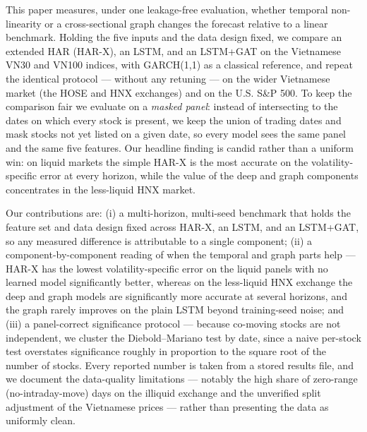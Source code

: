 \documentclass[runningheads]{llncs}
\begin{document}
This paper measures, under one leakage-free evaluation, whether temporal non-linearity or a cross-sectional
graph changes the forecast relative to a linear benchmark. Holding the five inputs and the data design fixed, we
compare an extended HAR (HAR-X), an LSTM, and an LSTM+GAT on the Vietnamese VN30 and VN100 indices, with
GARCH(1,1) as a classical reference, and repeat the identical protocol --- without any retuning --- on the wider
Vietnamese market (the HOSE and HNX exchanges) and on the U.S. S\&P 500. To keep the comparison fair we evaluate
on a \emph{masked panel}: instead of intersecting to the dates on which every stock is present, we keep the union
of trading dates and mask stocks not yet listed on a given date, so every model sees the same panel and the same
five features. Our headline finding is candid rather than a uniform win: on liquid markets the simple HAR-X is
the most accurate on the volatility-specific error at every horizon, while the value of the deep and graph
components concentrates in the less-liquid HNX market.

Our contributions are: (i) a multi-horizon, multi-seed benchmark that holds the feature set and data design fixed
across HAR-X, an LSTM, and an LSTM+GAT, so any measured difference is attributable to a single component; (ii) a
component-by-component reading of when the temporal and graph parts help --- HAR-X has the lowest
volatility-specific error on the liquid panels with no learned model significantly better, whereas on the
less-liquid HNX exchange the deep and graph models are significantly more accurate at several horizons, and the
graph rarely improves on the plain LSTM beyond training-seed noise; and (iii) a panel-correct significance
protocol --- because co-moving stocks are not independent, we cluster the Diebold--Mariano test by date, since a
naive per-stock test overstates significance roughly in proportion to the square root of the number of stocks.
Every reported number is taken from a stored results file, and we document the data-quality limitations ---
notably the high share of zero-range (no-intraday-move) days on the illiquid exchange and the unverified split
adjustment of the Vietnamese prices --- rather than presenting the data as uniformly clean.
\end{document}
